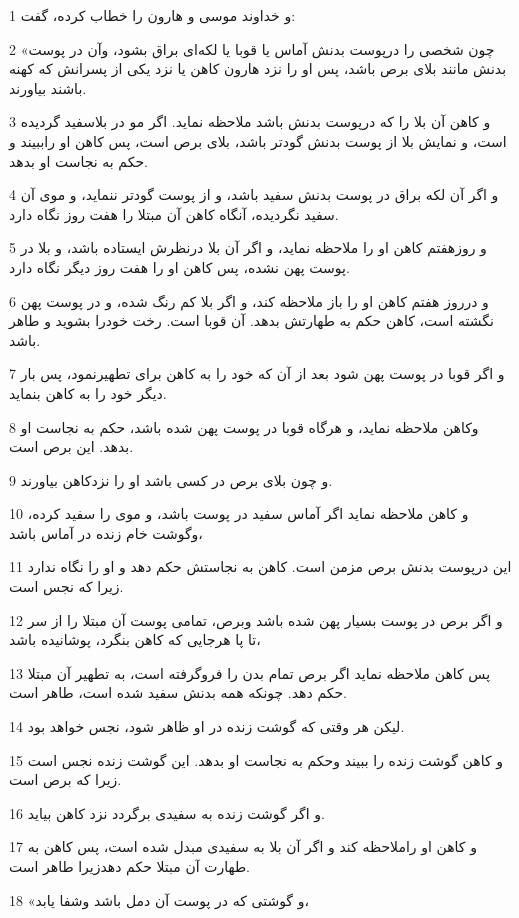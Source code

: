 \par 1 و خداوند موسی و هارون را خطاب کرده، گفت:
\par 2 «چون شخصی را درپوست بدنش آماس یا قوبا یا لکه‌ای براق بشود، وآن در پوست بدنش مانند بلای برص باشد، پس او را نزد هارون کاهن یا نزد یکی از پسرانش که کهنه باشند بیاورند.
\par 3 و کاهن آن بلا را که درپوست بدنش باشد ملاحظه نماید. اگر مو در بلاسفید گردیده است، و نمایش بلا از پوست بدنش گودتر باشد، بلای برص است، پس کاهن او راببیند و حکم به نجاست او بدهد.
\par 4 و اگر آن لکه براق در پوست بدنش سفید باشد، و از پوست گودتر ننماید، و موی آن سفید نگردیده، آنگاه کاهن آن مبتلا را هفت روز نگاه دارد.
\par 5 و روزهفتم کاهن او را ملاحظه نماید، و اگر آن بلا درنظرش ایستاده باشد، و بلا در پوست پهن نشده، پس کاهن او را هفت روز دیگر نگاه دارد.
\par 6 و درروز هفتم کاهن او را باز ملاحظه کند، و اگر بلا کم رنگ شده، و در پوست پهن نگشته است، کاهن حکم به طهارتش بدهد. آن قوبا است. رخت خودرا بشوید و طاهر باشد.
\par 7 و اگر قوبا در پوست پهن شود بعد از آن که خود را به کاهن برای تطهیرنمود، پس بار دیگر خود را به کاهن بنماید.
\par 8 وکاهن ملاحظه نماید، و هرگاه قوبا در پوست پهن شده باشد، حکم به نجاست او بدهد. این برص است.
\par 9 و چون بلای برص در کسی باشد او را نزدکاهن بیاورند.
\par 10 و کاهن ملاحظه نماید اگر آماس سفید در پوست باشد، و موی را سفید کرده، وگوشت خام زنده در آماس باشد،
\par 11 این درپوست بدنش برص مزمن است. کاهن به نجاستش حکم دهد و او را نگاه ندارد زیرا که نجس است.
\par 12 و اگر برص در پوست بسیار پهن شده باشد وبرص، تمامی پوست آن مبتلا را از سر تا پا هرجایی که کاهن بنگرد، پوشانیده باشد،
\par 13 پس کاهن ملاحظه نماید اگر برص تمام بدن را فروگرفته است، به تطهیر آن مبتلا حکم دهد. چونکه همه بدنش سفید شده است، طاهر است.
\par 14 لیکن هر وقتی که گوشت زنده در او ظاهر شود، نجس خواهد بود.
\par 15 و کاهن گوشت زنده را ببیند وحکم به نجاست او بدهد. این گوشت زنده نجس است زیرا که برص است.
\par 16 و اگر گوشت زنده به سفیدی برگردد نزد کاهن بیاید.
\par 17 و کاهن او راملاحظه کند و اگر آن بلا به سفیدی مبدل شده است، پس کاهن به طهارت آن مبتلا حکم دهدزیرا طاهر است.
\par 18 «و گوشتی که در پوست آن دمل باشد وشفا یابد،
